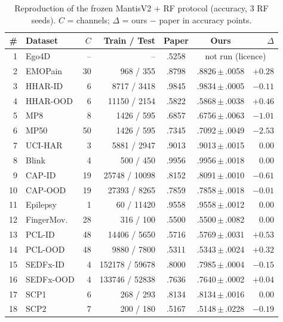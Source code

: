 \documentclass[conference]{IEEEtran}
\begin{document}
\begin{table}[t]
\caption{Reproduction of the frozen MantisV2 + RF protocol (accuracy, 3 RF seeds). $C$ = channels; $\Delta$ = ours
$-$ paper in accuracy points.}
\label{tab:repro}
\centering
\footnotesize
\setlength{\tabcolsep}{3pt}
\begin{tabular}{rlrrccr}
\toprule
\# & Dataset & $C$ & Train / Test & Paper & Ours & $\Delta$ \\
\midrule
1 & Ego4D & -- & -- & .5258 & \multicolumn{2}{c}{not run (licence)} \\
2 & EMOPain & 30 & 968 / 355 & .8798 & .8826\,$\pm$\,.0058 & $+0.28$ \\
3 & HHAR-ID & 6 & 8717 / 3418 & .9845 & .9834\,$\pm$\,.0005 & $-0.11$ \\
4 & HHAR-OOD & 6 & 11150 / 2154 & .5822 & .5868\,$\pm$\,.0038 & $+0.46$ \\
5 & MP8 & 8 & 1426 / 595 & .6857 & .6756\,$\pm$\,.0063 & $\mathbf{-1.01}$ \\
6 & MP50 & 50 & 1426 / 595 & .7345 & .7092\,$\pm$\,.0049 & $\mathbf{-2.53}$ \\
7 & UCI-HAR & 3 & 5881 / 2947 & .9013 & .9013\,$\pm$\,.0015 & $0.00$ \\
8 & Blink & 4 & 500 / 450 & .9956 & .9956\,$\pm$\,.0018 & $0.00$ \\
9 & CAP-ID & 19 & 25748 / 10098 & .8152 & .8091\,$\pm$\,.0010 & $-0.61$ \\
10 & CAP-OOD & 19 & 27393 / 8265 & .7859 & .7858\,$\pm$\,.0018 & $-0.01$ \\
11 & Epilepsy & 1 & 60 / 11420 & .9558 & .9558\,$\pm$\,.0012 & $0.00$ \\
12 & FingerMov. & 28 & 316 / 100 & .5500 & .5500\,$\pm$\,.0082 & $0.00$ \\
13 & PCL-ID & 48 & 14406 / 5650 & .5716 & .5769\,$\pm$\,.0031 & $+0.53$ \\
14 & PCL-OOD & 48 & 9880 / 7800 & .5311 & .5343\,$\pm$\,.0024 & $+0.32$ \\
15 & SEDFx-ID & 4 & 152178 / 59678 & .8000 & .7985\,$\pm$\,.0004 & $-0.15$ \\
16 & SEDFx-OOD & 4 & 133746 / 52838 & .7636 & .7640\,$\pm$\,.0002 & $+0.04$ \\
17 & SCP1 & 6 & 268 / 293 & .8134 & .8134\,$\pm$\,.0016 & $0.00$ \\
18 & SCP2 & 7 & 200 / 180 & .5167 & .5148\,$\pm$\,.0228 & $-0.19$ \\
\bottomrule
\end{tabular}
\end{table}
\end{document}
